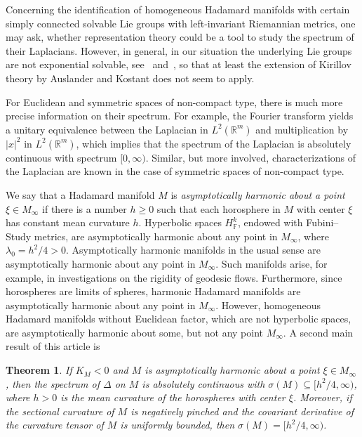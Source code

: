 \documentclass[pdftex]{sigma}
\numberwithin{equation}{section}
\newtheorem{Theorem}{Theorem}[section]
\def\F{\mathbb F}
\def\R{\mathbb R}
\begin{document}
Concerning the identification of homogeneous Hadamard manifolds
with certain simply connected solvable Lie groups with left-invariant Riemannian metrics,
one may ask, whether representation theory could be a tool to study the spectrum of their Laplacians.
However, in general, in our situation the underlying Lie groups are not exponential solvable,
see~\cite[p.~26 and p.~37]{AzencottWilsonI76} and~\cite[Remark (ii) on p.~16]{AzencottWilsonII76},
so that at least the extension of Kirillov theory by Auslander and Kostant does not seem to apply.

For Euclidean and symmetric spaces of non-compact type,
there is much more precise information on their spectrum.
For example, the Fourier transform yields a unitary equivalence between the Laplacian in $L^2(\R^m)$
and multiplication by $|x|^2$ in $L^2(\R^m)$,
which implies that the spectrum of the Laplacian is absolutely continuous with spectrum $[0,\infty)$.
Similar, but more involved, characterizations of the Laplacian are known
in the case of symmetric spaces of non-compact type.

We say that a Hadamard manifold $M$ is \emph{asymptotically harmonic about a point $\xi\in M_\infty$}
if there is a number $h\ge0$ such that each horosphere in $M$ with center $\xi$ has constant mean curvature $h$.
Hyperbolic spaces $H^k_{\F}$, endowed with Fubini--Study metrics, are asymptotically harmonic about any point in $M_\infty$, where $\lambda_0=h^2/4>0$.
Asymptotically harmonic manifolds in the usual sense are asymptotically harmonic about any point in $M_\infty$.
Such manifolds arise, for example, in investigations on the rigidity of geodesic flows.
Furthermore, since horospheres are limits of spheres,
harmonic Hadamard manifolds are asymptotically harmonic about any point in $M_\infty$.
However, homogeneous Hadamard manifolds without Euclidean factor,
which are not hyperbolic spaces, are asymptotically harmonic about some, but not any point $M_\infty$.
A second main result of this article is

\begin{Theorem}\label{onlyacm}
If $K_M<0$ and $M$ is asymptotically harmonic about a point $\xi\in M_\infty$,
then the spectrum of $\Delta$ on $M$ is absolutely continuous with $\sigma(M)\subseteq\bigl[h^2/4,\infty\bigr)$,
where $h>0$ is the mean curvature of the horospheres with center $\xi$.
Moreover, if the sectional curvature of $M$ is negatively pinched and the covariant derivative of the curvature tensor of $M$ is uniformly bounded, then $\sigma(M)=\bigl[h^2/4,\infty\bigr)$.
\end{Theorem}
\end{document}
